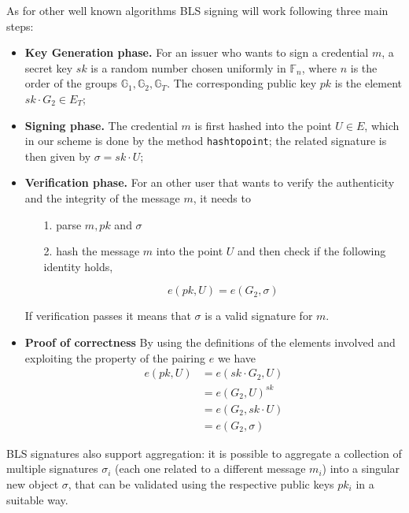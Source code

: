 As for other well known algorithms BLS signing will work following
three main steps:
\begin{itemize}

\item \textbf{Key Generation phase.} For an issuer who wants to sign a
  credential $m$, a secret key $sk$ is a random number chosen
  uniformly in $\mathbb{F}_n$, where $n$ is the order of the groups
  $\mathbb{G}_1, \mathbb{G}_2, \mathbb{G}_T$. The corresponding public
  key $pk$ is the element $sk\cdot G_2\in E_T$;

\item \textbf{Signing phase.} The credential $m$ is first hashed into
  the point $U\in E$, which in our scheme is done by the method
  \verb!hashtopoint!; the related signature is then given by $\sigma =
  sk\cdot U$;

\item \textbf{Verification phase.} For an other user that wants to
  verify the authenticity and the integrity of the message $m$, it
  needs to

  \begin{itemize}

  \item [1.] parse $m, pk$ and $\sigma$

  \item [2.] hash the message $m$ into the point $U$ and then
    check if the following identity holds,

    \[
    e(pk,U) = e(G_2,\sigma)
    \]

  \end{itemize}
If verification passes it means that $\sigma$ is a valid signature for
$m$.
\item \textbf{Proof of correctness} By using the definitions of the
  elements involved and exploiting the property of the pairing $e$ we
  have
\[
\begin{split}
    e(pk,U) &= e(sk\cdot G_2, U) \\
            &= e(G_2,U)^{sk}\\
            &= e(G_2,sk\cdot U)\\
            &= e(G_2,\sigma)
\end{split}
\]

\end{itemize}

BLS signatures also support aggregation: it is possible to aggregate a
collection of multiple signatures $\sigma_i$ (each one related to a
different message $m_i$) into a singular new object $\sigma$, that can
be validated using the respective public keys $pk_i$ in a suitable
way.

